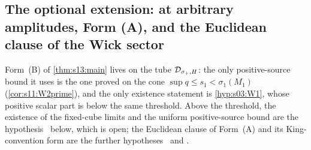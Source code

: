 \subsection{The optional extension: \texorpdfstring{\Wtwo}{(W2)} at arbitrary amplitudes, Form (A), and the Euclidean clause of the Wick sector}

Form~(B) of \cref{thm:s13:main} lives on the tube $\mathcal D_{\sigma_+,H}$: the only positive-source bound it uses is the one proved on the cone $\sup q\le s_1<\sigma_1(M_1)$ (\cref{cor:s11:W2prime}), and the only existence statement is \cref{hyp:s03:W1}, whose positive scalar part is below the same threshold. Above the threshold, the existence of the fixed-cube limits and the uniform positive-source bound are the hypothesis \Wtwo\ below, which is open; the Euclidean clause of Form~(A) and its King-convention form are the further hypotheses \RW\ and \FAK.



